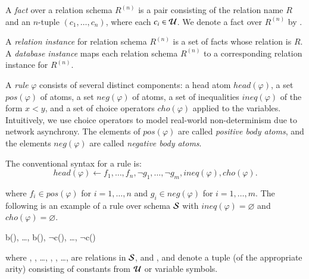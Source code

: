 A {\em fact} over a relation schema $R^{(n)}$ is a pair consisting of
the relation name $R$ and an $n$-tuple $(c_1,\ldots,c_n)$, where each
$c_i \in \univ$.  We denote a fact over $R^{(n)}$ by .

A {\em relation instance} for relation schema $R^{(n)}$ is a set of facts whose relation is $R$.
A {\em database instance} maps each relation schema $R^{(n)}$ to a corresponding relation instance for
$R^{(n)}$.

A {\em rule} $\varphi$ consists of several distinct components: a head atom $head(\varphi)$, a set $pos(\varphi)$ of atoms, a set $neg(\varphi)$ of atoms, a set of inequalities $ineq(\varphi)$ of the form $x < y$, and a set of choice operators $cho(\varphi)$ applied to the variables.  Intuitively, we use choice operators to model real-world non-determinism due to network asynchrony.  The elements of $pos(\varphi)$ are called {\em positive body atoms}, and the elements $neg(\varphi)$ are called {\em negative body atoms}.

The conventional syntax for a rule is:
$$head(\varphi) \leftarrow f_1,\ldots,f_n,\lnot g_1,\ldots,\lnot g_m, ineq(\varphi), cho(\varphi).$$

where $f_i \in pos(\varphi)$ for $i = 1,\ldots,n$ and $g_i \in neg(\varphi)$ for $i = 1,\ldots,m$.  The following is an example of a rule over schema $\schema$ with $ineq(\varphi) = \varnothing$ and $cho(\varphi) = \varnothing$.

\begin{Drules}
        {b(), \ldots, b(), $\lnot$c(), \ldots, $\lnot$c()}
\end{Drules}

\noindent where , , \ldots, ,
, \ldots,  are relations in $\schema$, and ,
 and  denote a tuple (of the appropriate arity)
consisting of constants from $\univ$ or variable symbols.

